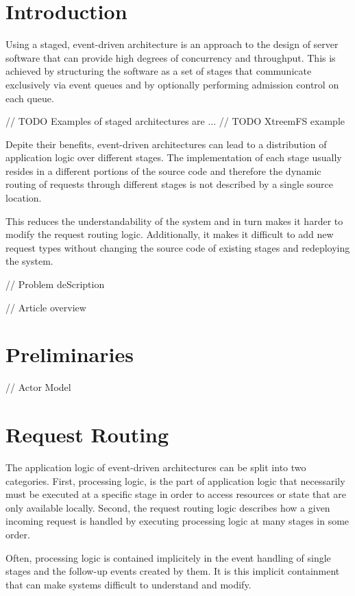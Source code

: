 \documentclass{sig-alternate}
\begin{document}
\section{Introduction}             

Using a staged, event-driven architecture is an approach to the design of server software that can 
provide high degrees of concurrency and throughput.  This is achieved by structuring the software as
a set of stages that communicate exclusively via event queues and by optionally performing admission 
control on each queue.  

// TODO Examples of staged architectures are ...
// TODO XtreemFS example

Depite their benefits, event-driven architectures can lead to a distribution of application logic
over different stages. The implementation of each stage usually resides in a different portions of
the source code and therefore the dynamic routing of requests through different stages is not
described by a single source location.

This reduces the understandability of the system and in turn makes it harder to modify the request
routing logic. Additionally, it makes it difficult to add new request types without changing the
source code of existing stages and redeploying the system.

// Problem deScription

// Article overview
                                
                         
\section{Preliminaries}

// Actor Model


\section{Request Routing}

The application logic of event-driven architectures can be split into two categories. First,
processing logic, is the part of application logic that necessarily must be executed at a specific
stage in order to access resources or state that are only available locally. Second, the request
routing logic describes how a given incoming request is handled by executing processing logic at
many stages in some order. 

Often, processing logic is contained implicitely in the event handling of single stages and the
follow-up events created by them. It is this implicit containment that can make systems difficult to
understand and modify.
\end{document}
